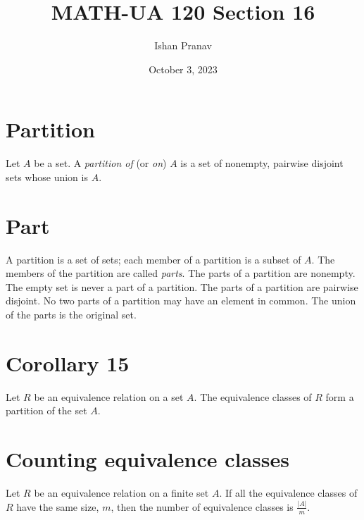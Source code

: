 \documentclass[12pt]{article}
\title{MATH-UA 120 Section 16}
\author{Ishan Pranav}
\date{October 3, 2023}
\begin{document}
\maketitle
\section*{Partition}
Let $A$ be a set. A \textit{partition of} (or \textit{on}) $A$ is a set of nonempty, pairwise disjoint sets whose union is $A$.
\section*{Part}
A partition is a set of sets; each member of a partition is a subset of $A$. The members of the partition are called \textit{parts}.
The parts of a partition are nonempty. The empty set is never a part of a partition.
The parts of a partition are pairwise disjoint. No two parts of a partition may have an element in common. The union of the parts is the original set.
\section*{Corollary 15}
Let $R$ be an equivalence relation on a set $A$. The equivalence classes of $R$ form a partition of the set $A$.
\section*{Counting equivalence classes}
Let $R$ be an equivalence relation on a finite set $A$. If all the equivalence classes of $R$ have the same size, $m$, then the number of equivalence classes is $\frac{|A|}{m}$.
\end{document}

